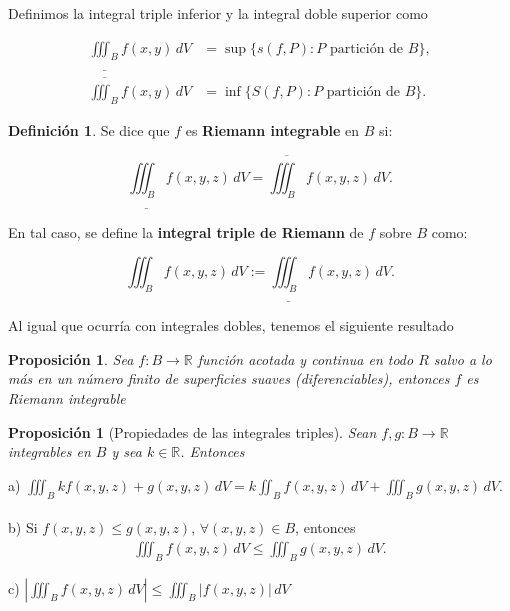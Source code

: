 \documentclass{article}
\theoremstyle{plain}
\newtheorem{prop}[thm]{Proposición}
\theoremstyle{definition}
\newtheorem{defin}[thm]{Definición}
\begin{document}
Definimos la integral triple inferior y la integral doble superior como

\begin{align*}
    \underline{\iiint_B} f(x,y)\,dV &= \sup \{ s(f,P) : P \text{ partición de } B \}, \\
    \overline{\iiint_B} f(x,y)\,dV &= \inf \{ S(f,P) : P \text{ partición de } B \}.
\end{align*}


\begin{defin}Se dice que \( f \) es \textbf{Riemann integrable} en \( B \) si:
\end{defin}

\[
    \underline{\iiint_B} f(x,y,z)\,dV = \overline{\iiint_B} f(x,y,z)\,dV.
\]

En tal caso, se define la \textbf{integral triple de Riemann} de \( f \) sobre \( B \) como:

\[
    \iiint_B f(x,y,z)\,dV := \underline{\iiint_B} f(x,y,z)\,dV.
\]


Al igual que ocurr\'ia con integrales dobles, tenemos el siguiente resultado\\

\begin{prop}Sea $f: B \to \mathbb{R}$ función acotada y continua en todo $R$ salvo a lo más en un número finito de superficies suaves (diferenciables), entonces $f$ es Riemann integrable \\
\end{prop}

\begin{prop}[Propiedades de las integrales triples]Sean $f,g: B \to \mathbb{R}$ integrables en $B$ y sea $k \in \mathbb{R}$. Entonces \\
\end{prop}

a) $\displaystyle \iiint_B kf(x,y,z)+g(x,y,z) \,dV = k\iint_B f(x,y,z)\,dV+ \iiint_B g(x,y,z) \,dV.$ \\ \\

b) Si $f(x,y,z) \leq g(x,y,z) $, $\forall (x,y,z) \in B$, entonces
\begin{align*}
    \displaystyle \iiint_B f(x,y,z)\,dV \leq \iiint_B g(x,y,z) \,dV.
\end{align*}

c) $\displaystyle \left|\iiint_B f(x,y,z) \,dV\right| \leq \iiint_B |f(x,y,z)|\,dV$ \\ \\\
\end{document}
